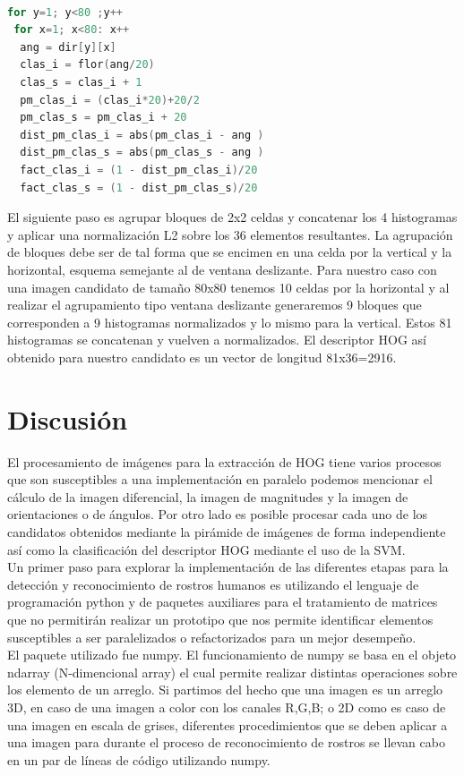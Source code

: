 \documentclass{article}
\begin{document}
\begin{lstlisting}[language=C, caption=Calculo de la imagen diferencial]

for y=1; y<80 ;y++
 for x=1; x<80: x++
  ang = dir[y][x]
  clas_i = flor(ang/20)
  clas_s = clas_i + 1
  pm_clas_i = (clas_i*20)+20/2
  pm_clas_s = pm_clas_i + 20
  dist_pm_clas_i = abs(pm_clas_i - ang )
  dist_pm_clas_s = abs(pm_clas_s - ang )
  fact_clas_i = (1 - dist_pm_clas_i)/20
  fact_clas_s = (1 - dist_pm_clas_s)/20

\end{lstlisting}

El siguiente paso es agrupar bloques de 2x2 celdas y concatenar los 4 histogramas y aplicar una normalización L2 sobre los 36 elementos resultantes. La agrupación de bloques debe ser de tal forma que se encimen en una celda por la vertical y la horizontal, esquema  semejante al de ventana deslizante. Para nuestro caso con una imagen candidato de tamaño 80x80 tenemos 10 celdas por la horizontal y al realizar el agrupamiento tipo ventana deslizante generaremos 9 bloques que corresponden a 9 histogramas normalizados y lo mismo para la vertical. Estos 81 histogramas se concatenan y vuelven a normalizados.  El descriptor HOG así obtenido para nuestro candidato es un vector de longitud 81x36=2916.


\section*{Discusión}
El procesamiento de imágenes para la extracción de HOG tiene varios procesos que son susceptibles a una implementación en paralelo podemos mencionar el cálculo de la imagen diferencial, la imagen de magnitudes y la  imagen de orientaciones o de ángulos.  Por otro lado es posible procesar cada uno de los candidatos obtenidos mediante la pirámide de imágenes de forma independiente así como la clasificación del descriptor HOG mediante el uso de la SVM.\\

Un primer paso para explorar la implementación de las diferentes etapas para la detección y reconocimiento  de rostros humanos es utilizando el lenguaje de programación python\cite{pythonwebsite} y de paquetes auxiliares para el tratamiento de matrices que no permitirán realizar un prototipo que nos permite identificar elementos susceptibles a ser paralelizados o refactorizados para un mejor desempeño.\\

El paquete utilizado fue numpy\cite{numpywebsite}. El funcionamiento de numpy se basa en el objeto ndarray (N-dimencional array) el cual permite realizar distintas operaciones sobre los elemento de un arreglo. Si partimos del hecho que una imagen es un arreglo 3D, en caso de una imagen a color con los canales  R,G,B; o 2D como es caso de una imagen en escala de grises, diferentes procedimientos que se deben aplicar a una imagen para durante el proceso de reconocimiento de rostros se llevan cabo en un par de líneas de código utilizando numpy. \\
\end{document}
